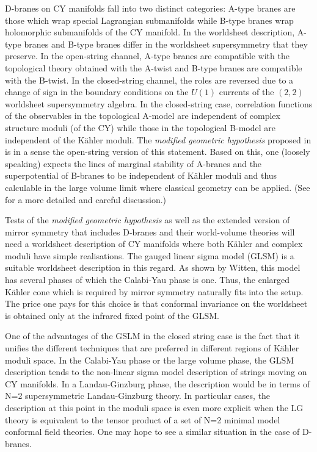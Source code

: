 \documentclass[a4paper,12pt]{article}
\begin{document}
D-branes on CY manifolds fall into two distinct categories: A-type branes
are those which wrap special Lagrangian submanifolds while B-type branes
wrap holomorphic submanifolds of the CY manifold. In the worldsheet
description\cite{ooy}, A-type branes and B-type branes differ in the
worldsheet supersymmetry that they preserve. In the open-string channel,
A-type branes are compatible with the topological theory obtained with the
A-twist and B-type branes are compatible with the B-twist. In the
closed-string channel, the roles are reversed due to a change of sign in
the boundary conditions on the $U(1)$ currents of the $(2,2)$ worldsheet
supersymmetry algebra. In the closed-string case\cite{topwitten},
correlation functions of the observables in the topological A-model are
independent of complex structure moduli (of the CY) while those in the
topological B-model are independent of the K\"ahler moduli. The {\it
modified geometric hypothesis} proposed in \cite{quintic,doug1} is in a
sense the open-string version of this statement. Based on this, one
(loosely speaking) expects the lines of marginal stability of A-branes and
the superpotential of B-branes to be independent of K\"ahler moduli and
thus calculable in the large volume limit where classical geometry can be
applied. (See \cite{doug1} for a more detailed and careful discussion.)

Tests of the {\it modified geometric hypothesis} as well as the extended
version of mirror symmetry that includes D-branes and their world-volume
theories will need a worldsheet description of CY manifolds where both
K\"ahler and complex moduli have simple realisations. The gauged linear
sigma model (GLSM) is a suitable worldsheet description in this regard. 
As shown by Witten, this model has several phases of which the Calabi-Yau
phase is one. Thus, the enlarged K\"ahler cone which is required by mirror
symmetry naturally fits into the setup\cite{agm}.  The price one pays for
this choice is that conformal invariance on the worldsheet is obtained
only at the infrared fixed point of the GLSM. 

One of the advantages of the GSLM in the closed string case is the fact
that it unifies the different techniques that are preferred in different
regions of K\"ahler moduli space. In the Calabi-Yau phase or the large
volume phase, the GLSM description tends to the non-linear sigma model
description of strings moving on CY manifolds. In a Landau-Ginzburg phase,
the description would be in terms of N=2 supersymmetric Landau-Ginzburg
theory. In particular cases, the description at this point in the moduli
space is even more explicit when the LG theory is equivalent to the tensor
product of a set of N=2 minimal model conformal field theories. One may
hope to see a similar situation in the case of D-branes. 
\end{document}
